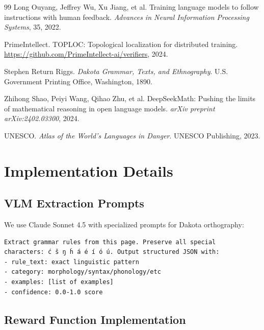 \documentclass{article}
\begin{document}
\begin{thebibliography}{99}
Long Ouyang, Jeffrey Wu, Xu Jiang, et al.
\newblock Training language models to follow instructions with human feedback.
\newblock \emph{Advances in Neural Information Processing Systems}, 35, 2022.

PrimeIntellect.
\newblock TOPLOC: Topological localization for distributed training.
\newblock \url{https://github.com/PrimeIntellect-ai/verifiers}, 2024.

Stephen Return Riggs.
\newblock \emph{Dakota Grammar, Texts, and Ethnography}.
\newblock U.S. Government Printing Office, Washington, 1890.

Zhihong Shao, Peiyi Wang, Qihao Zhu, et al.
\newblock DeepSeekMath: Pushing the limits of mathematical reasoning in open language models.
\newblock \emph{arXiv preprint arXiv:2402.03300}, 2024.

UNESCO.
\newblock \emph{Atlas of the World's Languages in Danger}.
\newblock UNESCO Publishing, 2023.

\end{thebibliography}

\clearpage
\appendix

\section{Implementation Details}
\label{appendix:implementation}

\subsection{VLM Extraction Prompts}

We use Claude Sonnet 4.5 with specialized prompts for Dakota orthography:

\begin{verbatim}
Extract grammar rules from this page. Preserve all special 
characters: ć š ŋ ḣ á é í ó ú. Output structured JSON with:
- rule_text: exact linguistic pattern
- category: morphology/syntax/phonology/etc
- examples: [list of examples]
- confidence: 0.0-1.0 score
\end{verbatim}

\subsection{Reward Function Implementation}
\end{document}
